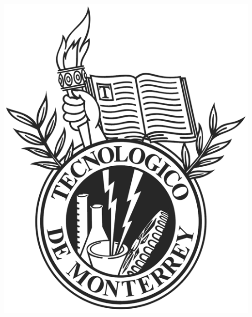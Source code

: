 \pagestyle{empty}
\begin{center}
\begin{center}
\includegraphics[scale=0.5]{images/escudo-itesm_small.png}
\end{center}
\vspace{17 pt}
\renewcommand{\baselinestretch}{1.0}
\Huge

\end{center}
